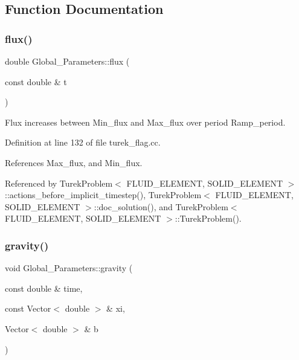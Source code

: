 \subsection{Function Documentation}
\mbox{\label{namespaceGlobal__Parameters_a536aa5314a6cdb36af852e9513351d55}} 
\subsubsection{\texorpdfstring{flux()}{flux()}}
{\footnotesize\ttfamily double Global\+\_\+\+Parameters\+::flux (\begin{DoxyParamCaption}\item[{const double \&}]{t }\end{DoxyParamCaption})}



Flux increases between Min\+\_\+flux and Max\+\_\+flux over period Ramp\+\_\+period. 



Definition at line 132 of file turek\+\_\+flag.\+cc.



References Max\+\_\+flux, and Min\+\_\+flux.



Referenced by Turek\+Problem$<$ F\+L\+U\+I\+D\+\_\+\+E\+L\+E\+M\+E\+N\+T, S\+O\+L\+I\+D\+\_\+\+E\+L\+E\+M\+E\+N\+T $>$\+::actions\+\_\+before\+\_\+implicit\+\_\+timestep(), Turek\+Problem$<$ F\+L\+U\+I\+D\+\_\+\+E\+L\+E\+M\+E\+N\+T, S\+O\+L\+I\+D\+\_\+\+E\+L\+E\+M\+E\+N\+T $>$\+::doc\+\_\+solution(), and Turek\+Problem$<$ F\+L\+U\+I\+D\+\_\+\+E\+L\+E\+M\+E\+N\+T, S\+O\+L\+I\+D\+\_\+\+E\+L\+E\+M\+E\+N\+T $>$\+::\+Turek\+Problem().

\mbox{\label{namespaceGlobal__Parameters_a200109847bf4cc26da4d00e8d68d569e}} 
\subsubsection{\texorpdfstring{gravity()}{gravity()}}
{\footnotesize\ttfamily void Global\+\_\+\+Parameters\+::gravity (\begin{DoxyParamCaption}\item[{const double \&}]{time,  }\item[{const Vector$<$ double $>$ \&}]{xi,  }\item[{Vector$<$ double $>$ \&}]{b }\end{DoxyParamCaption})}




